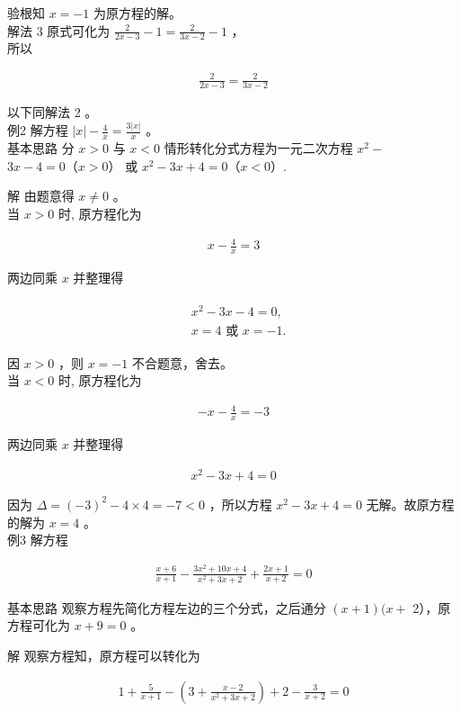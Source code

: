 \documentclass[10pt]{article}
\begin{document}
验根知 $x=-1$ 为原方程的解。\\
解法 3 原式可化为 $\frac{2}{2 x-3}-1=\frac{2}{3 x-2}-1$ ，\\
所以

\begin{align*}
\frac{2}{2 x-3}=\frac{2}{3 x-2}
\end{align*}

以下同解法 2 。\\
例2 解方程 $|x|-\frac{4}{x}=\frac{3|x|}{x}$ 。\\
基本思路 分 $x>0$ 与 $x<0$ 情形转化分式方程为一元二次方程 $x^{2}-$ $3 x-4=0（x>0）$ 或 $x^{2}-3 x+4=0（x<0）$.

解 由题意得 $x \neq 0$ 。\\
当 $x>0$ 时, 原方程化为

\begin{align*}
x-\frac{4}{x}=3
\end{align*}

两边同乘 $x$ 并整理得

\begin{align*}
\begin{aligned}
& x^{2}-3 x-4=0, \\
& x=4 \text { 或 } x=-1 .
\end{aligned}
\end{align*}

因 $x>0$ ，则 $x=-1$ 不合题意，舍去。\\
当 $x<0$ 时, 原方程化为

\begin{align*}
-x-\frac{4}{x}=-3
\end{align*}

两边同乘 $x$ 并整理得

\begin{align*}
x^{2}-3 x+4=0
\end{align*}

因为 $\Delta=(-3)^{2}-4 \times 4=-7<0$ ，所以方程 $x^{2}-3 x+4=0$ 无解。故原方程的解为 $x=4$ 。\\
例3 解方程

\begin{align*}
\frac{x+6}{x+1}-\frac{3 x^{2}+10 x+4}{x^{2}+3 x+2}+\frac{2 x+1}{x+2}=0
\end{align*}

基本思路 观察方程先简化方程左边的三个分式，之后通分 $(x+1)(x+$ 2），原方程可化为 $x+9=0$ 。

解 观察方程知，原方程可以转化为

\begin{align*}
1+\frac{5}{x+1}-\left(3+\frac{x-2}{x^{2}+3 x+2}\right)+2-\frac{3}{x+2}=0
\end{align*}
\end{document}
